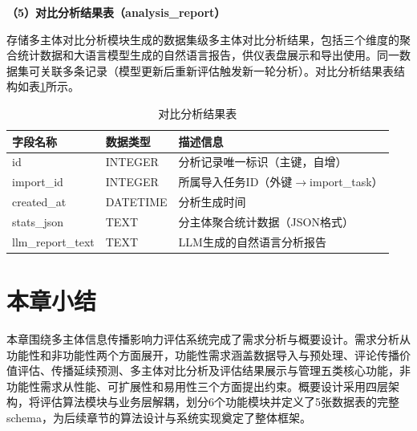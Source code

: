 \textbf{（5）对比分析结果表（analysis\_report）}

存储多主体对比分析模块生成的数据集级多主体对比分析结果，包括三个维度的聚合统计数据和大语言模型生成的自然语言报告，供仪表盘展示和导出使用。同一数据集可关联多条记录（模型更新后重新评估触发新一轮分析）。对比分析结果表结构如表\ref{tab:analysis_report}所示。

\begin{table}[H]
  \centering
  \caption{对比分析结果表}
  \label{tab:analysis_report}
  \renewcommand\arraystretch{1.35}
  \begin{tabular}{>{\centering\arraybackslash}m{3cm} >{\centering\arraybackslash}m{2cm} >{\centering\arraybackslash}m{8.5cm}}
    \toprule
    字段名称 & 数据类型 & 描述信息 \\
    \midrule
    id & INTEGER & 分析记录唯一标识（主键，自增） \\
    import\_id & INTEGER & 所属导入任务ID（外键$\to$import\_task） \\
    created\_at & DATETIME & 分析生成时间 \\
    stats\_json & TEXT & 分主体聚合统计数据（JSON格式） \\
    llm\_report\_text & TEXT & LLM生成的自然语言分析报告 \\
    \bottomrule
  \end{tabular}
\end{table}

\section{本章小结}

本章围绕多主体信息传播影响力评估系统完成了需求分析与概要设计。需求分析从功能性和非功能性两个方面展开，功能性需求涵盖数据导入与预处理、评论传播价值评估、传播延续预测、多主体对比分析及评估结果展示与管理五类核心功能，非功能性需求从性能、可扩展性和易用性三个方面提出约束。概要设计采用四层架构，将评估算法模块与业务层解耦，划分6个功能模块并定义了5张数据表的完整schema，为后续章节的算法设计与系统实现奠定了整体框架。
